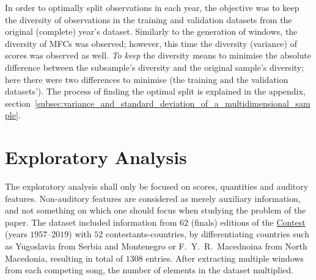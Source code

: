 \documentclass[conference, a4paper, 12pt]{IEEEtran}
\begin{document}
    \par

    In order to optimally split observations in each year, the objective was to keep the diversity of observations in the training and validation datasets from the original (complete) year's dataset. Similarly to the generation of windows, the diversity of MFCs was observed; however, this time the diversity (variance) of scores was observed as well. \emph{To keep} the diversity means to minimise the absolute difference between the subsample's diversity and the original sample's diversity; here there were two differences to minimise (the training and the validation datasets'). The process of finding the optimal split is explained in the appendix, section~\ref{subsec:variance_and_standard_deviation_of_a_multidimensional_sample}.

    \par

    \par

    \section{Exploratory Analysis}
    \label{sec:exploratory_analysis}

    The exploratory analysis shall only be focused on scores, quantities and auditory features. Non-auditory features are considered as merely auxiliary information, and not something on which one should focus when studying the problem of the paper. The dataset included information from $ 62 $ (finals) editions of the \href{http://eurovision.tv/}{Contest} (years $ 1957 $--$ 2019 $) with $ 52 $ contestants-countries, by differentiating countries such as Yugoslavia from Serbia and Montenegro or F.~Y.~R.~Macednoina from North Macedonia, resulting in total of $ 1308 $ entries. After extracting multiple windows from each competing song, the number of elements in the dataset multiplied.

    \par
\end{document}
